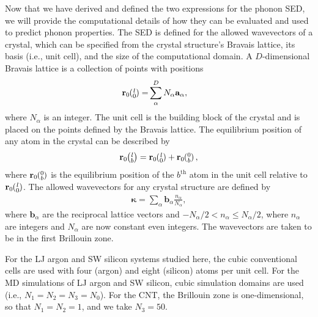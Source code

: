 \documentclass[12pt,twocolumn,iop]{/usr/share/texmf-texlive/tex/latex/iop/iopart}[/usr/share/texmf-texlive/tex/latex/iop/]
\newcommand{\ab}[2]{\mspace{-4.0mu}\left(\mspace{-8.0mu}\begin{smallmatrix}&\ifthenelse{\equal{#1}{}}{a}{#1} \\&\ifthenelse{\equal{#2}{}}{b}{#2}\end{smallmatrix}\mspace{-3.0mu}\right)}
\begin{document}
Now that we have derived and defined the two expressions for the phonon SED, we will provide the computational details of how they can be evaluated and used to predict phonon properties. The SED is defined for the allowed wavevectors of a crystal, which can be specified from the crystal structure's Bravais lattice, its basis (i.e., unit cell), and the size of the computational domain. A $D$-dimensional Bravais lattice is a collection of points with
positions
\begin{equation}\label{crys_pos}
\begin{split}
\mathbf{r}_0\ab{l}{0} =& \sum^D_{\alpha} N_{\alpha}\mathbf{a}_{\alpha},
\end{split}
\end{equation}
where $N_{\alpha}$ is an integer.\cite{dove1993} The unit cell is the building block of the crystal and is placed on the points defined by the Bravais lattice. The equilibrium position of any atom in the crystal can be described by
\begin{equation}\label{crys_pos2}
\begin{split}
\mathbf{r}_0\ab{l}{b} = \mathbf{r}_0\ab{l}{0} + \mathbf{r}_0\ab{0}{b},
\end{split}
\end{equation}
where $\mathbf{r}_0\ab{0}{b}$ is the equilibrium position of the $b^{\textrm{th}}$ atom in the unit cell relative to $\mathbf{r}_0\ab{l}{0}$. The allowed wavevectors for any crystal structure are defined by
\begin{equation}\label{crys_pos3}
\begin{split}
\pmb{\kappa} = \sum_{\alpha} \mathbf{b}_{\alpha} \frac{n_{\alpha}}{N_{\alpha}},
\end{split}
\end{equation}
where $\mathbf{b}_{\alpha}$ are the reciprocal lattice vectors and $-N_{\alpha}/2 < n_{\alpha} \leq N_{\alpha}/2$, where $n_{\alpha}$ are integers and $N_{\alpha}$ are now constant even integers. The wavevectors are taken to be in the first Brillouin zone.\cite{ashcroft1976}

For the LJ argon and SW silicon systems studied here, the cubic conventional cells are used with four (argon) and eight (silicon) atoms per unit cell. For the MD simulations of LJ argon and SW silicon, cubic simulation domains are used (i.e., $N_1 = N_2 = N_3 = N_0$).\cite{mcgaughey2004a,turney2009a} For the CNT, the Brillouin zone is one-dimensional, so that $N_1 = N_2 = 1$, and we take $N_3=50$.\cite{thomas2010c}
\end{document}
